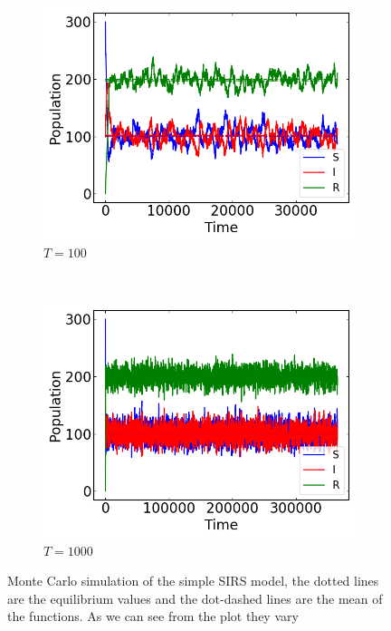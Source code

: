 \begin{figure}[H]
\begin{subfigure}{0.49\textwidth}
         \includegraphics[width=\linewidth]{../fig/texfig/MC_T100.png}
         \caption{$T = 100$}
    \end{subfigure}
     ~ 
    \begin{subfigure}{0.49\textwidth}
         \centering
         \includegraphics[width=\linewidth]{../fig/texfig/MC_T1000.png}
         \caption{$T = 1000$}
    \end{subfigure}
    \caption{Monte Carlo simulation of the simple SIRS model, the dotted lines are the equilibrium values and the dot-dashed lines are the mean of the functions. As we can see from the plot they vary }
    \label{fig:MCb1Tchanges}
\end{figure}

